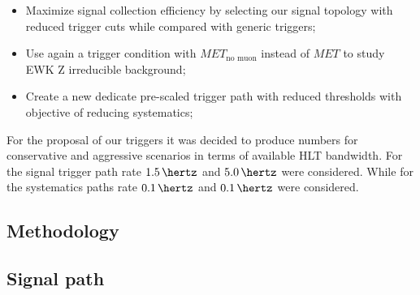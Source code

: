 \begin{itemize}
  \item Maximize signal collection efficiency by selecting our signal topology with reduced trigger cuts while compared with generic triggers;
  \item Use again a trigger condition with $MET_{\text{no muon}}$ instead of $MET$ to study \gls{EWK} Z irreducible background;
  \item Create a new dedicate pre-scaled trigger path with reduced thresholds with objective of reducing systematics;
\end{itemize}

For the proposal of our triggers it was decided to produce numbers for conservative and aggressive scenarios in terms of available \gls{HLT} bandwidth. For the signal trigger path rate $1.5\,\hertz$ and $5.0\,\hertz$ were considered. While for the systematics paths rate $0.1\,\hertz$ and $0.1\,\hertz$ were considered.

\subsection{Methodology}



\subsection{Signal path}


% 
% 
% 

